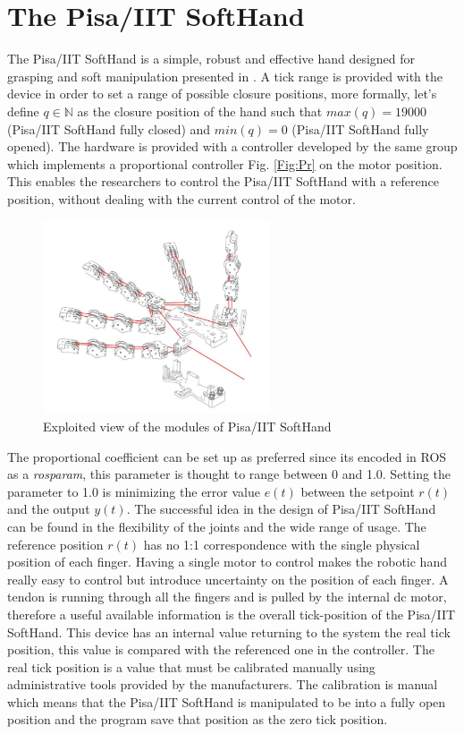 \section{The Pisa/IIT SoftHand}
The Pisa/IIT SoftHand is a simple, robust and effective hand designed for grasping and soft manipulation presented in \cite{catalanopisa}. A tick range is provided with the device in order to set a range of possible closure positions, more formally, let's define $q \in \mathbb{N}$ as the closure position of the hand such that $max(q) = 19000$ (Pisa/IIT SoftHand fully closed) and $min(q)=0$ (Pisa/IIT SoftHand fully opened). The hardware is provided with a controller developed by the same group which implements a proportional controller Fig. \ref{Fig:Pr} on the motor position. This enables the researchers to control the Pisa/IIT SoftHand with a reference position, without dealing with the current control of the motor. \\
\begin{figure}[h]
\centering
\includegraphics[width=0.6\textwidth]{Figure/softhand.png}
\caption{Exploited view of the modules of Pisa/IIT SoftHand}
\label{Fig:Softhand}
\end{figure}
The proportional coefficient can be set up as preferred since its encoded in ROS as a \textit{rosparam}, this parameter is thought to range between 0 and 1.0. Setting the parameter to 1.0 is minimizing the error value $e(t)$  between the setpoint $r(t)$ and the output $y(t)$.
The successful idea in the design of Pisa/IIT SoftHand can be found in the flexibility of the joints and the wide range of usage.
The reference position $r(t)$ has no 1:1 correspondence with the single physical position of each finger. Having a single motor to control makes the robotic hand really easy to control but introduce uncertainty on the position of each finger. A tendon is running through all the fingers and is pulled by the internal dc motor, therefore a useful available information is the overall tick-position of the Pisa/IIT SoftHand. 
This device has an internal value returning to the system the real tick position, this value is compared with the referenced one in the controller. The real tick position is a value that must be calibrated manually using administrative tools provided by the manufacturers. The calibration is manual which means that the Pisa/IIT SoftHand is manipulated to be into a fully open position and the program save that position as the zero tick position.

